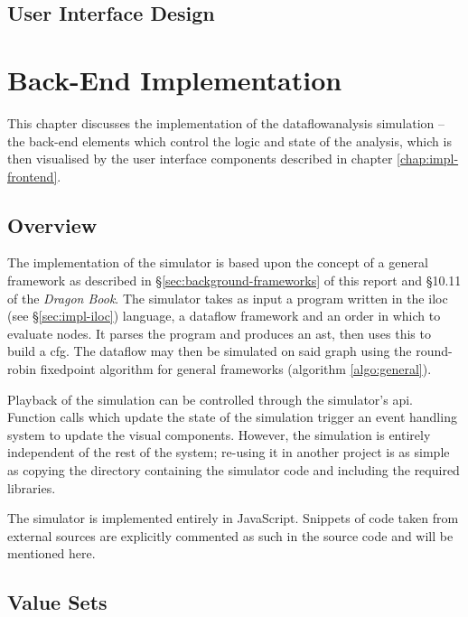 \documentclass[bsc,twoside,singlespacing,parskip,logo,notimes,normalheadings]{infthesis}
\begin{document}
    \section{User Interface Design}\label{sec:design-interface}

    

\chapter{Back-End Implementation}\label{chap:impl-backend}
This chapter discusses the implementation of the
\gls{dataflowanalysis} simulation -- the back-end elements which
control the logic and state of the analysis, which is then visualised
by the user interface components described in chapter
\ref{chap:impl-frontend}.

    \section{Overview}
    The implementation of the simulator is based upon the concept of a
    general framework as described in
    \S\ref{sec:background-frameworks} of this report and \S10.11 of
    the {\em Dragon Book}\cite{dragonbook}. The simulator takes as
    input a program written in the \gls{iloc} (see
    \S\ref{sec:impl-iloc}) language, a \gls{dataflow} framework and an
    order in which to evaluate nodes. It parses the program and
    produces an \gls{ast}, then uses this to build a \gls{cfg}. The
    \gls{dataflow} may then be simulated on said graph using the
    round-robin \gls{fixedpoint} algorithm for general frameworks
    (algorithm \ref{algo:general}).

    Playback of the simulation can be controlled through the
    simulator's \gls{api}. Function calls which update the state of
    the simulation trigger an event handling system to update the
    visual components. However, the simulation is entirely independent
    of the rest of the system; re-using it in another project is as
    simple as copying the directory containing the simulator code and
    including the required libraries.

    The simulator is implemented entirely in JavaScript. Snippets of
    code taken from external sources are explicitly commented as such
    in the source code and will be mentioned here.

    \section{Value Sets}
\end{document}
